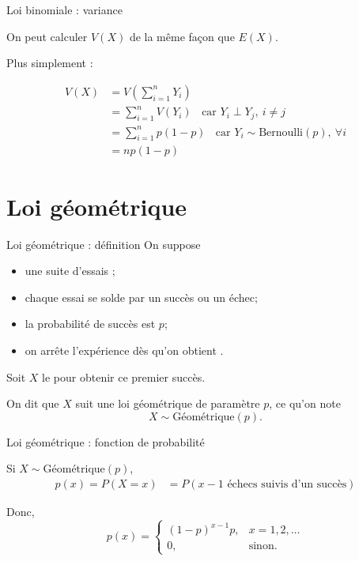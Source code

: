 \documentclass{BeamerTemplate}
\begin{document}
\begin{frame}[t]{Loi binomiale : variance}

{\small

On peut calculer $V(X)$ de la même façon que $E(X)$.

\smallskip
Plus simplement : 

\begin{align*}
V(X) &= V\left(\sum_{i=1}^n Y_i \right)\\
&= \sum_{i=1}^n V(Y_i) \; \; \mbox{ car } Y_i \perp Y_j, \ i \ne j \\
&= \sum_{i=1}^n p(1-p) \; \; \mbox{ car } Y_i \sim \mbox{Bernoulli}(p), \ \forall i\\
&= np(1-p)
\end{align*}

}

\end{frame}

\section{Loi géométrique}

\begin{frame}[t]{Loi géométrique : définition}
On suppose
\begin{itemize}
 \item une suite d'essais ;
 \item chaque essai se solde par un succès ou un échec;
 \item la probabilité de succès  est $p$;
 \item on arrête l'expérience dès qu'on obtient .
\end{itemize}

\medskip
Soit $X$ le  pour obtenir
ce premier succès.

\bigskip
On dit que $X$ suit une loi géométrique de paramètre $p$, ce qu'on note
$$X\sim \mbox{Géométrique}(p).$$
\end{frame}


\begin{frame}{Loi géométrique : fonction de probabilité}

Si $X\sim \text{Géométrique}(p)$,
\begin{align*}
p(x) = P(X=x) &= P(x-1 \mbox{ échecs suivis d'un succès})
\end{align*}

\vspace{0.1in}
Donc,
$$p(x)=\left\{\begin{array}{ll}
(1-p)^{x-1}p, & x=1,2,\ldots\\
0, & \text{sinon}.
\end{array}\right.$$

\end{frame}
\end{document}
